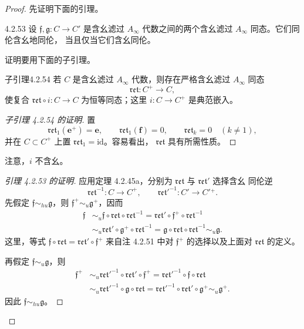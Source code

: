 \begin{proof}
先证明下面的引理。

\begin{lemma}{4.2.53}\label{lem:4-2-53}
设 $\mathfrak f,\mathfrak g\colon C\to C'$ 是含幺滤过
$A_\infty$ 代数之间的两个含幺滤过 $A_\infty$ 同态。它们同伦含幺地同伦，
当且仅当它们含幺同伦。
\end{lemma}

证明要用下面的子引理。

\begin{statement}{子引理}{4.2.54}\label{sublem:4-2-54}
若 $C$ 是含幺滤过 $A_\infty$ 代数，则存在严格含幺滤过
$A_\infty$ 同态
\[
 \mathfrak{ret}\colon C^+\longrightarrow C,
\]
使复合 $\mathfrak{ret}\circ i\colon C\to C$ 为恒等同态；这里
$i\colon C\to C^+$ 是典范嵌入。
\end{statement}

\begin{proof}[子引理 4.2.54 的证明]
置
\[
 \mathfrak{ret}_1(\mathbf e^+)=\mathbf e,
 \qquad
 \mathfrak{ret}_1(\mathbf f)=0,
 \qquad
 \mathfrak{ret}_k=0\quad(k\ne1),
\]
并在 $C\subset C^+$ 上置 $\mathfrak{ret}_1=\mathrm{id}$。容易看出，
$\mathfrak{ret}$ 具有所需性质。
\end{proof}

注意，$i$ 不含幺。

\begin{proof}[引理 4.2.53 的证明]
应用定理 4.2.45a，分别为 $\mathfrak{ret}$ 与 $\mathfrak{ret}'$ 选择含幺
同伦逆
\[
 \mathfrak{ret}^{-1}\colon C\longrightarrow C^+,
 \qquad
 \mathfrak{ret}'^{-1}\colon C'\longrightarrow C'{}^+.
\]
先假定 $\mathfrak f\sim_{hu}\mathfrak g$，则
$\mathfrak f^+\sim_u\mathfrak g^+$，因而
{\small
\begin{align*}
 \mathfrak f
 &\sim_u\mathfrak f\circ\mathfrak{ret}\circ\mathfrak{ret}^{-1}
  =\mathfrak{ret}'\circ\mathfrak f^+\circ\mathfrak{ret}^{-1}\\
 &\sim_u\mathfrak{ret}'\circ\mathfrak g^+\circ\mathfrak{ret}^{-1}
  =\mathfrak g\circ\mathfrak{ret}\circ\mathfrak{ret}^{-1}
  \sim_u\mathfrak g.
\end{align*}
}
这里，等式
$\mathfrak f\circ\mathfrak{ret}=\mathfrak{ret}'\circ\mathfrak f^+$
来自注 4.2.51 中对 $\mathfrak f^+$ 的选择以及上面对
$\mathfrak{ret}$ 的定义。

再假定 $\mathfrak f\sim_u\mathfrak g$，则
{\small
\begin{align*}
 \mathfrak f^+
 &\sim_u\mathfrak{ret}'^{-1}\circ\mathfrak{ret}'\circ\mathfrak f^+
  =\mathfrak{ret}'^{-1}\circ\mathfrak f\circ\mathfrak{ret}\\
 &\sim_u\mathfrak{ret}'^{-1}\circ\mathfrak g\circ\mathfrak{ret}
  =\mathfrak{ret}'^{-1}\circ\mathfrak{ret}'\circ\mathfrak g^+
  \sim_u\mathfrak g^+.
\end{align*}
}
因此 $\mathfrak f\sim_{hu}\mathfrak g$。
\end{proof}


\end{proof}
